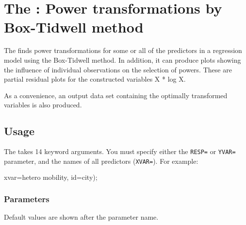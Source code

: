 
\section{The : Power transformations by Box-Tidwell method}\label{mac:boxtid}

The  finds power transformations for some or all of the
predictors in a regression model using the Box-Tidwell method.  In
addition, it can produce plots showing the influence of individual
observations on the selection of powers. These are partial residual
plots for the constructed variables X * log X.

As a convenience, an output data set containing the optimally
transformed variables is also produced.

\subsection*{Usage}

The  takes 14 keyword arguments.  You must specify either
the \texttt{RESP=} or \texttt{YVAR=} parameter, and the names of all predictors (\texttt{XVAR=}).
For example:

\begin{listing}
       xvar=hetero mobility, id=city);
\end{listing}
\subsubsection*{Parameters}

Default values are shown after the parameter name.

